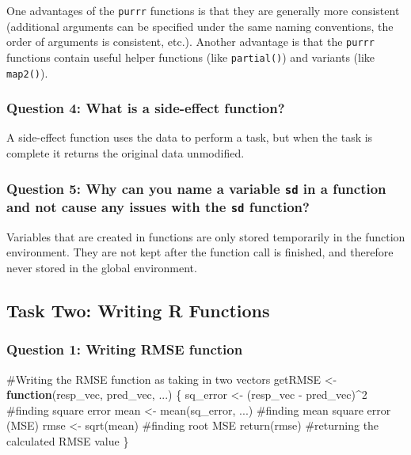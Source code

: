 \documentclass[
  letterpaper,
  DIV=11,
  numbers=noendperiod]{scrartcl}
\newenvironment{Shaded}{\begin{snugshade}}{\end{snugshade}}
\newcommand{\CommentTok}[1]{\textcolor[rgb]{0.37,0.37,0.37}{#1}}
\newcommand{\ControlFlowTok}[1]{\textcolor[rgb]{0.00,0.23,0.31}{\textbf{#1}}}
\newcommand{\DecValTok}[1]{\textcolor[rgb]{0.68,0.00,0.00}{#1}}
\newcommand{\FunctionTok}[1]{\textcolor[rgb]{0.28,0.35,0.67}{#1}}
\newcommand{\NormalTok}[1]{\textcolor[rgb]{0.00,0.23,0.31}{#1}}
\newcommand{\OtherTok}[1]{\textcolor[rgb]{0.00,0.23,0.31}{#1}}
\newcommand{\SpecialCharTok}[1]{\textcolor[rgb]{0.37,0.37,0.37}{#1}}
\begin{document}
One advantages of the \texttt{purrr} functions is that they are
generally more consistent (additional arguments can be specified under
the same naming conventions, the order of arguments is consistent,
etc.). Another advantage is that the \texttt{purrr} functions contain
useful helper functions (like \texttt{partial()}) and variants (like
\texttt{map2()}).

\subsubsection{Question 4: What is a side-effect
function?}\label{question-4-what-is-a-side-effect-function}

A side-effect function uses the data to perform a task, but when the
task is complete it returns the original data unmodified.

\subsubsection{\texorpdfstring{Question 5: Why can you name a variable
\texttt{sd} in a function and not cause any issues with the \texttt{sd}
function?}{Question 5: Why can you name a variable sd in a function and not cause any issues with the sd function?}}\label{question-5-why-can-you-name-a-variable-sd-in-a-function-and-not-cause-any-issues-with-the-sd-function}

Variables that are created in functions are only stored temporarily in
the function environment. They are not kept after the function call is
finished, and therefore never stored in the global environment.

\newpage

\subsection{Task Two: Writing R
Functions}\label{task-two-writing-r-functions}

\subsubsection{Question 1: Writing RMSE
function}\label{question-1-writing-rmse-function}

\begin{Shaded}
\begin{Highlighting}[]
\CommentTok{\#Writing the RMSE function as taking in two vectors}
\NormalTok{getRMSE }\OtherTok{\textless{}{-}} \ControlFlowTok{function}\NormalTok{(resp\_vec, pred\_vec, ...) \{}
\NormalTok{  sq\_error }\OtherTok{\textless{}{-}}\NormalTok{ (resp\_vec }\SpecialCharTok{{-}}\NormalTok{ pred\_vec)}\SpecialCharTok{\^{}}\DecValTok{2} \CommentTok{\#finding square error}
\NormalTok{  mean }\OtherTok{\textless{}{-}} \FunctionTok{mean}\NormalTok{(sq\_error, ...) }\CommentTok{\#finding mean square error (MSE)}
\NormalTok{  rmse }\OtherTok{\textless{}{-}} \FunctionTok{sqrt}\NormalTok{(mean) }\CommentTok{\#finding root MSE}
  \FunctionTok{return}\NormalTok{(rmse) }\CommentTok{\#returning the calculated RMSE value}
\NormalTok{  \}}
\end{Highlighting}
\end{Shaded}
\end{document}
